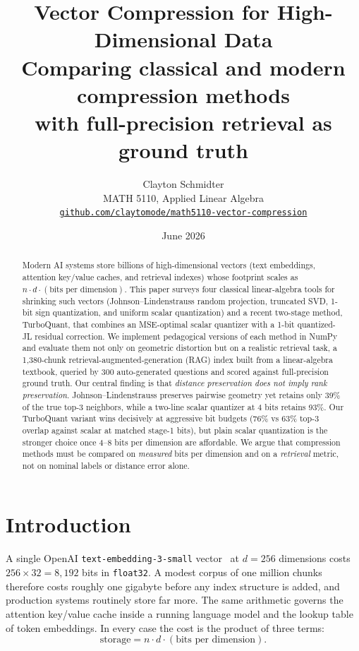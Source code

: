 \documentclass[11pt]{article}
\title{\textbf{Vector Compression for High-Dimensional Data}\\[0.4em]
\large Comparing classical and modern compression methods\\ with full-precision retrieval as ground truth}
\author{Clayton Schmidter\\
MATH 5110, Applied Linear Algebra\\
\href{https://github.com/claytomode/math5110-vector-compression}{\texttt{github.com/claytomode/math5110-vector-compression}}}
\date{June 2026}
\begin{document}
\maketitle

\begin{abstract}
\noindent
Modern AI systems store billions of high-dimensional vectors (text embeddings, attention key/value caches, and retrieval indexes) whose footprint scales as $n \cdot d \cdot (\text{bits per dimension})$. This paper surveys four classical linear-algebra tools for shrinking such vectors (Johnson--Lindenstrauss random projection, truncated SVD, 1-bit sign quantization, and uniform scalar quantization) and a recent two-stage method, TurboQuant, that combines an MSE-optimal scalar quantizer with a 1-bit quantized-JL residual correction. We implement pedagogical versions of each method in NumPy and evaluate them not only on geometric distortion but on a realistic retrieval task, a 1{,}380-chunk retrieval-augmented-generation (RAG) index built from a linear-algebra textbook, queried by 300 auto-generated questions and scored against full-precision ground truth. Our central finding is that \emph{distance preservation does not imply rank preservation}. Johnson--Lindenstrauss preserves pairwise geometry yet retains only 39\% of the true top-3 neighbors, while a two-line scalar quantizer at 4 bits retains 93\%. Our TurboQuant variant wins decisively at aggressive bit budgets (76\% vs 63\% top-3 overlap against scalar at matched stage-1 bits), but plain scalar quantization is the stronger choice once 4--8 bits per dimension are affordable. We argue that compression methods must be compared on \emph{measured} bits per dimension and on a \emph{retrieval} metric, not on nominal labels or distance error alone.
\end{abstract}

\section{Introduction}

A single OpenAI \texttt{text-embedding-3-small} vector~\cite{openai} at $d = 256$ dimensions costs $256 \times 32 = 8{,}192$ bits in \texttt{float32}. A modest corpus of one million chunks therefore costs roughly one gigabyte before any index structure is added, and production systems routinely store far more. The same arithmetic governs the attention key/value cache inside a running language model and the lookup table of token embeddings. In every case the cost is the product of three terms:
\begin{equation}
\text{storage} = n \cdot d \cdot (\text{bits per dimension}).
\end{equation}
\end{document}
